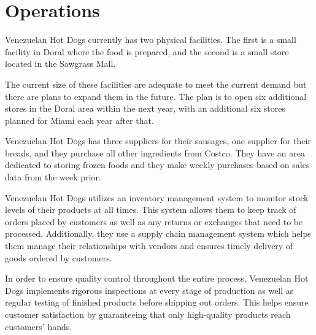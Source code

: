 

\section{Operations} \label{sec:operations}
 Venezuelan Hot Dogs currently has two physical facilities. The first is a small facility in Doral where the food is prepared, and the second is a small store located in the Sawgrass Mall.  

The current size of these facilities are adequate to meet the current demand but there are plans to expand them in the future. The plan is to open six additional stores in the Doral area within the next year, with an additional six stores planned for Miami each year after that.  

 Venezuelan Hot Dogs has three suppliers for their sausages, one supplier for their breads, and they purchase all other ingredients from Costco. They have an area dedicated to storing frozen foods and they make weekly purchases based on sales data from the week prior.  

 Venezuelan Hot Dogs utilizes an inventory management system to monitor stock levels of their products at all times. This system allows them to keep track of orders placed by customers as well as any returns or exchanges that need to be processed. Additionally, they use a supply chain management system which helps them manage their relationships with vendors and ensures timely delivery of goods ordered by customers.  

 In order to ensure quality control throughout the entire process, Venezuelan Hot Dogs implements rigorous inspections at every stage of production as well as regular testing of finished products before shipping out orders. This helps ensure customer satisfaction by guaranteeing that only high-quality products reach customers' hands.  

